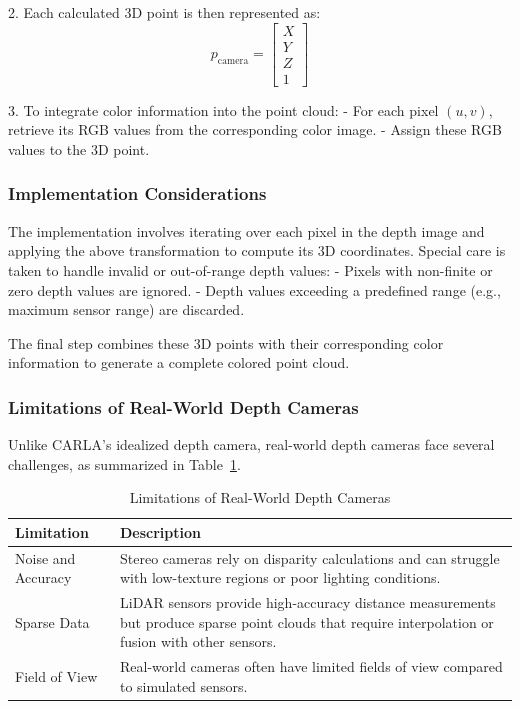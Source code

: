 2. Each calculated 3D point is then represented as:
   \[
   p_{\text{camera}} = \begin{bmatrix} X \\ Y \\ Z \\ 1 \end{bmatrix}
   \]

3. To integrate color information into the point cloud:
   - For each pixel \((u, v)\), retrieve its RGB values from the corresponding color image.
   - Assign these RGB values to the 3D point.

\subsubsection{Implementation Considerations}

The implementation involves iterating over each pixel in the depth image and applying the above transformation to compute its 3D coordinates. Special care is taken to handle invalid or out-of-range depth values:
- Pixels with non-finite or zero depth values are ignored.
- Depth values exceeding a predefined range (e.g., maximum sensor range) are discarded.

The final step combines these 3D points with their corresponding color information to generate a complete colored point cloud.

\subsubsection{Limitations of Real-World Depth Cameras}

Unlike CARLA's idealized depth camera, real-world depth cameras face several challenges, as summarized in Table~\ref{table:depth_camera_limitations}.

\begin{table}[h!]
\centering
\begin{tabular}{@{}p{4cm}p{10cm}@{}}
\toprule
\textbf{Limitation} & \textbf{Description} \\
\midrule
Noise and Accuracy & Stereo cameras rely on disparity calculations and can struggle with low-texture regions or poor lighting conditions. \\
\midrule
Sparse Data & \ac{LiDAR} sensors provide high-accuracy distance measurements but produce sparse point clouds that require interpolation or fusion with other sensors. \\
\midrule
Field of View & Real-world cameras often have limited fields of view compared to simulated sensors. \\
\bottomrule
\end{tabular}
\caption{Limitations of Real-World Depth Cameras}
\label{table:depth_camera_limitations}
\end{table}

